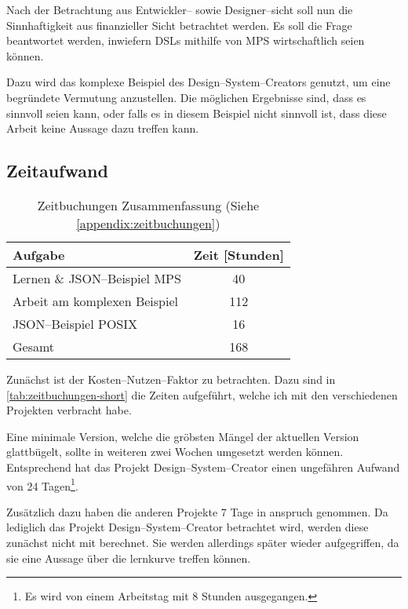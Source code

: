 Nach der Betrachtung aus Entwickler-- sowie Designer--sicht soll nun die Sinnhaftigkeit aus finanzieller Sicht betrachtet werden.
Es soll die Frage beantwortet werden, inwiefern \acp{DSL} mithilfe von \ac{MPS} wirtschaftlich seien können.

Dazu wird das komplexe Beispiel des Design--System--Creators genutzt, um eine begründete Vermutung anzustellen.
Die möglichen Ergebnisse sind, dass es sinnvoll seien kann, oder falls es in diesem Beispiel nicht sinnvoll ist, dass diese Arbeit keine Aussage dazu treffen kann.

\subsection{Zeitaufwand}\label{subsec:zeitaufwand}
\begin{table}[ht]
    \centering
    \begin{tabular}{|l|c|}
        \hline
        Aufgabe                                & Zeit [Stunden] \\
        \hline
        \hline
        Lernen \& \ac{JSON}--Beispiel \ac{MPS} & 40             \\
        \hline
        Arbeit am komplexen Beispiel           & 112            \\
        \hline
        \ac{JSON}--Beispiel \ac{POSIX}         & 16             \\
        \hline
        \hline
        Gesamt                                 & 168            \\
        \hline
    \end{tabular}
    \caption{Zeitbuchungen Zusammenfassung (Siehe \autoref{appendix:zeitbuchungen})}
    \label{tab:zeitbuchungen-short}
\end{table}
Zunächst ist der Kosten--Nutzen--Faktor zu betrachten.
Dazu sind in \autoref{tab:zeitbuchungen-short} die Zeiten aufgeführt, welche ich mit den verschiedenen Projekten verbracht habe.

Eine minimale Version, welche die gröbsten Mängel der aktuellen Version glattbügelt, sollte in weiteren zwei Wochen umgesetzt werden können.
Entsprechend hat das Projekt Design--System--Creator einen ungefähren Aufwand von 24 Tagen\footnote{Es wird von einem Arbeitstag mit 8 Stunden ausgegangen.}.

Zusätzlich dazu haben die anderen Projekte 7 Tage in anspruch genommen.
Da lediglich das Projekt Design--System--Creator betrachtet wird, werden diese zunächst nicht mit berechnet.
Sie werden allerdings später wieder aufgegriffen, da sie eine Aussage über die lernkurve treffen können.

